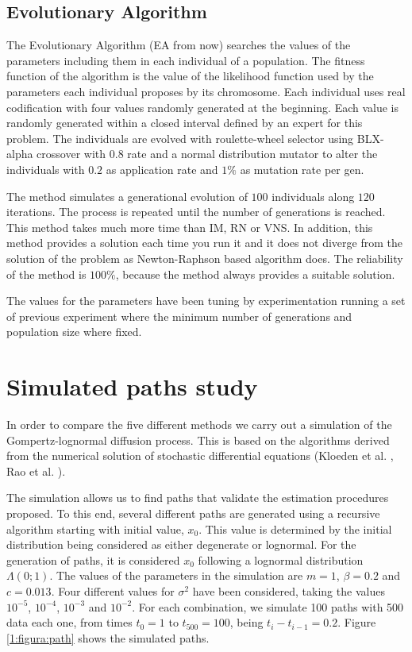 \documentclass{sig-alternate}
\begin{document}
\subsection{Evolutionary Algorithm}
\label{subsec:EA}
The Evolutionary Algorithm (EA from now) \cite{EA} searches the values of the parameters including them in each individual of a population. The fitness function of the algorithm is the value of the likelihood function used by the parameters each individual proposes by its chromosome. Each individual uses real codification with four values randomly generated at the beginning. Each value is randomly generated within a closed interval defined by an expert for this problem. The individuals are evolved with roulette-wheel selector using BLX-alpha crossover \cite{blx} with $0.8$ rate and a normal distribution mutator to alter the individuals with $0.2$ as application rate and $1\%$ as mutation rate per gen.

The method simulates a generational evolution of $100$ individuals along $120$ iterations. The process is repeated until the number of generations is reached. This method takes much more time than IM, RN or VNS. In addition, this method provides a solution each time you run it and it does not diverge from the solution of the problem as Newton-Raphson based algorithm does. The reliability of the method is $100\%$, because the method always provides a suitable solution.

The values for the parameters have been tuning by experimentation running a set of previous experiment where the minimum number of generations and population size where fixed.


\section{Simulated paths study}
\label{sec:pathsStudy}
In order to compare the five different methods we carry out a simulation of the Gompertz-lognormal diffusion process. This is based on the algorithms derived from the numerical solution of stochastic differential equations (Kloeden et al. \cite{Kloeden}, Rao et al. \cite{Rao}).

The simulation allows us to find paths that validate the estimation procedures proposed. To this end, several different paths are generated using a recursive algorithm starting with initial value, $x_0$. This value is determined by the initial distribution being considered as either degenerate or lognormal. For the generation of paths, it is considered $x_0$ following a lognormal distribution $\Lambda(0;1)$. The values of the parameters in the simulation are $m=1$, $\beta=0.2$ and $c=0.013$. Four different values for $\sigma^2$ have been considered, taking the values $10^{-5}$, $10^{-4}$, $10^{-3}$ and $10^{-2}$. For each combination, we simulate 100 paths with 500 data each one, from times $t_0=1$ to $t_{500}=100$, being $t_i-t_{i-1}=0.2$. Figure \ref{1:figura:path} shows the simulated paths.
\end{document}
